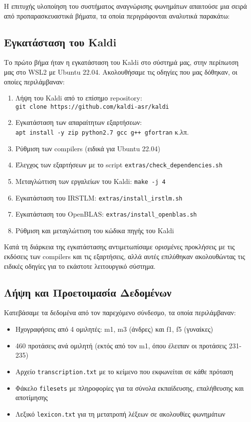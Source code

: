 \documentclass[a4paper,12pt]{article}
\begin{document}
Η επιτυχής υλοποίηση του συστήματος αναγνώρισης φωνημάτων απαιτούσε μια σειρά από προπαρασκευαστικά βήματα, τα οποία περιγράφονται αναλυτικά παρακάτω:

\subsection{Εγκατάσταση του Kaldi}

Το πρώτο βήμα ήταν η εγκατάσταση του Kaldi στο σύστημά μας, στην περίπωτση μας στο WSL2 με Ubuntu 22.04. Ακολουθήσαμε τις οδηγίες που μας δόθηκαν, οι οποίες περιλάμβαναν:

\begin{enumerate}
    \item Λήψη του Kaldi από το επίσημο repository: \\ 
    \verb|git clone https://github.com/kaldi-asr/kaldi|
    \item Εγκατάσταση των απαραίτητων εξαρτήσεων: \\ 
    \verb|apt install -y zip python2.7 gcc g++ gfortran| κ.λπ.
    \item Ρύθμιση των compilers (ειδικά για Ubuntu 22.04)
    \item Έλεγχος των εξαρτήσεων με το script \verb|extras/check_dependencies.sh|
    \item Μεταγλώττιση των εργαλείων του Kaldi: \verb|make -j 4|
    \item Εγκατάσταση του IRSTLM: \verb|extras/install_irstlm.sh|
    \item Εγκατάσταση του OpenBLAS: \verb|extras/install_openblas.sh|
    \item Ρύθμιση και μεταγλώττιση του κώδικα πηγής του Kaldi
\end{enumerate}

Κατά τη διάρκεια της εγκατάστασης αντιμετωπίσαμε ορισμένες προκλήσεις με τις εκδόσεις των compilers και τις εξαρτήσεις, αλλά αυτές επιλύθηκαν ακολουθώντας τις ειδικές οδηγίες για το εκάστοτε λειτουργικό σύστημα.

\subsection{Λήψη και Προετοιμασία Δεδομένων}

Κατεβάσαμε τα δεδομένα από τον παρεχόμενο σύνδεσμο, τα οποία περιλάμβαναν:

\begin{itemize}
    \item Ηχογραφήσεις από 4 ομιλητές: m1, m3 (άνδρες) και f1, f5 (γυναίκες)
    \item 460 προτάσεις ανά ομιλητή (εκτός από τον m1, όπου έλειπαν οι προτάσεις 231-235)
    \item Αρχείο \verb|transcription.txt| με το κείμενο που εκφωνείται σε κάθε πρόταση
    \item Φάκελο \verb|filesets| με πληροφορίες για τα σύνολα εκπαίδευσης, επαλήθευσης και αποτίμησης
    \item Λεξικό \verb|lexicon.txt| για τη μετατροπή λέξεων σε ακολουθίες φωνημάτων
\end{itemize}
\end{document}
